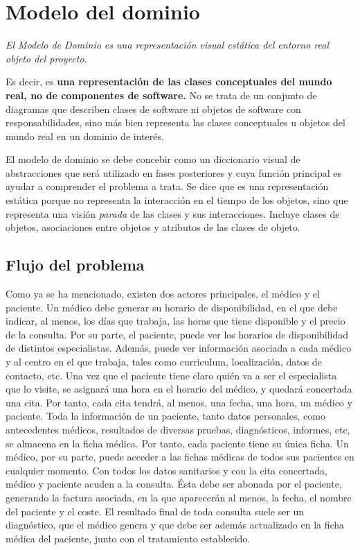 \section{Modelo del dominio} %
\label{sec:modelo_del_dominio}
	{\it El Modelo de Dominio es una representación visual estática del entorno real objeto del proyecto.}

	Es decir, es {\bf una representación de las clases conceptuales del mundo real, no de componentes de software.} No se trata de un conjunto de diagramas que describen clases de software ni objetos de software con responsabilidades, sino más bien representa las clases conceptuales u objetos del mundo real en un dominio de interés. 

	El modelo de dominio  se debe concebir como un diccionario visual de abstracciones que será utilizado en fases posteriores y  cuya función principal es ayudar a comprender el problema a trata. Se dice que es una representación estática porque no representa la interacción en el tiempo de los objetos, sino que representa una visión \textit{parada} de las clases y sus interacciones. Incluye clases de objetos, asociaciones entre objetos y atributos de las clases de objeto.

	\subsection{Flujo del problema}
		Como ya se ha mencionado, existen dos actores principales, el médico y el paciente. 
		Un médico debe generar su horario de disponibilidad, en el que debe indicar, al menos, los días que trabaja, las horas que tiene disponible y el precio de la consulta. Por su parte, el paciente, puede ver los horarios de disponibilidad de distintos especialistas. Además, puede ver información asociada a cada médico y al centro en el que trabaja, tales como curriculum, localización, datos de contacto, etc.
		Una vez que el paciente tiene claro quién va a ser el especialista que lo visite, se asignará una hora en el horario del médico, y quedará concertada una cita. Por tanto, cada cita tendrá, al menos, una fecha, una hora, un médico y paciente.
		Toda la información de un paciente, tanto datos personales, como antecedentes médicos, resultados de diversas pruebas, diagnósticos, informes, etc, se almacena en la ficha médica. Por tanto, cada paciente tiene su única ficha. Un médico, por su parte, puede acceder a las fichas médicas de todos sus pacientes en cualquier momento.
		Con todos los datos sanitarios y con la cita concertada, médico y paciente acuden a la consulta. Ésta debe ser abonada por el paciente, generando la factura asociada, en la que aparecerán al menos, la fecha, el nombre del paciente y el coste. El resultado final de toda consulta suele ser un diagnóstico, que el médico genera y que debe ser además actualizado en la ficha médica del paciente, junto con el tratamiento establecido.

